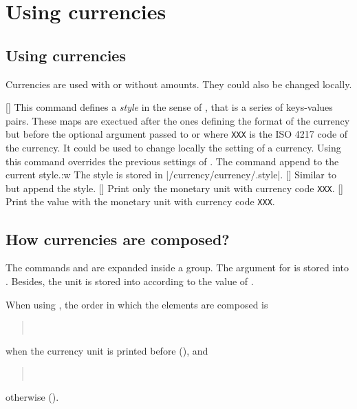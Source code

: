 \documentclass[12pt,add-index]{cnltx-doc}
\begin{document}
\section{Using currencies}
\label{sec:using}

\subsection{Using currencies}

Currencies are used with or without amounts. They could also be changed locally. 

\begin{commands}
    []
    This command defines a \emph{style} in the sense of , that 
    is a series of keys-values pairs.  
    These maps are exectued after
    the ones defining the format of the currency but before the optional 
    argument passed to  or  where \texttt{XXX} is
    the ISO 4217 code of the currency. It could be used to change locally 
    the setting of a currency. Using this command overrides the previous settings of
    . The command  append to the current style.:w
    The style is stored in \verbcode|/currency/currency/.style|.
    [] Similar to  but 
    append the style.
    [] Print only the monetary unit with currency code \texttt{XXX}.
    [] Print the value with the monetary unit with currency code \texttt{XXX}.
\end{commands}

\subsection{How currencies are composed?}

The commands  and  are expanded inside a group. 
The argument  for  is stored into .
Besides, the unit is stored into  according 
to the value of .

When using , the order in which the elements are composed is 
\begin{quote}
    \ \ \ \ \
    \ 
\end{quote}
when the currency unit is printed before (), and 
\begin{quote}
     \ \ \ \ \ \ 
\end{quote}
otherwise ().
\end{document}
